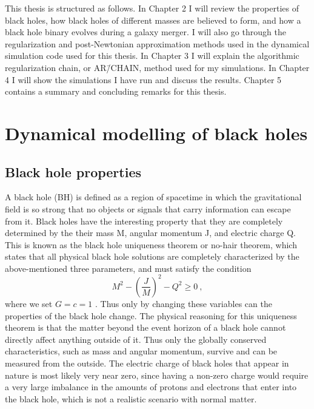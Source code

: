 \documentclass[english, oneside]{HYgradu}
\begin{document}
This thesis is structured as follows. In Chapter 2 I will review the properties of black holes, how black holes of different masses are believed to form, and how a black hole binary evolves during a galaxy merger. I will also go through the regularization and post-Newtonian approximation methods used in the dynamical simulation code used for this thesis. In Chapter 3 I will explain the algorithmic regularization chain, or AR\=/CHAIN, method used for my simulations. In Chapter 4 I will show the simulations I have run and discuss the results. Chapter 5 contains a summary and concluding remarks for this thesis.

\chapter{Dynamical modelling of black holes}

\section{Black hole properties}

A black hole (BH) is defined as a region of spacetime in which the gravitational field is so strong that no objects or signals that carry information can escape from it. Black holes have the interesting property that they are completely determined by the their mass M, angular momentum J, and electric charge Q. This is known as the black hole uniqueness theorem or no-hair theorem, which states that all physical black hole solutions are completely characterized by the above-mentioned three parameters, and must satisfy the condition 
\begin{equation} \label{equ:bhunique}
M^2 - \left( \frac{J}{M} \right)^2 - Q^2 \geq 0 \ ,
\end{equation}
where we set $G = c = 1$ \citep{mazur:2001}.
Thus only by changing these variables can the properties of the black hole change. The physical reasoning for this uniqueness theorem is that the matter beyond the event horizon of a black hole cannot directly affect anything outside of it. Thus only the globally conserved characteristics, such as mass and angular momentum, survive and can be measured from the outside. The electric charge of black holes that appear in nature is most likely very near zero, since having a non-zero charge would require a very large imbalance in the amounts of protons and electrons that enter into the black hole, which is not a realistic scenario with normal matter.
\end{document}
